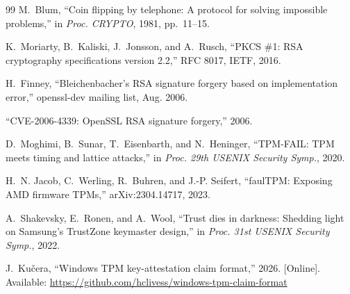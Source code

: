 \documentclass[conference,10pt]{IEEEtran}
\begin{document}
\begin{thebibliography}{99}
M.~Blum, ``Coin flipping by telephone: A protocol for solving impossible problems,'' in
\emph{Proc. CRYPTO}, 1981, pp.~11--15.

K.~Moriarty, B.~Kaliski, J.~Jonsson, and A.~Rusch, ``PKCS \#1: RSA cryptography
specifications version 2.2,'' RFC 8017, IETF, 2016.

H.~Finney, ``Bleichenbacher's RSA signature forgery based on implementation error,''
openssl-dev mailing list, Aug. 2006.

``CVE-2006-4339: OpenSSL RSA signature forgery,'' 2006.

D.~Moghimi, B.~Sunar, T.~Eisenbarth, and N.~Heninger, ``TPM-FAIL: TPM meets timing and lattice
attacks,'' in \emph{Proc. 29th USENIX Security Symp.}, 2020.

H.~N. Jacob, C.~Werling, R.~Buhren, and J.-P. Seifert, ``faulTPM: Exposing AMD firmware TPMs,''
arXiv:2304.14717, 2023.

A.~Shakevsky, E.~Ronen, and A.~Wool, ``Trust dies in darkness: Shedding light on Samsung's
TrustZone keymaster design,'' in \emph{Proc. 31st USENIX Security Symp.}, 2022.

J.~Ku\v{c}era, ``Windows TPM key-attestation claim format,'' 2026. [Online]. Available:
\url{https://github.com/hclivess/windows-tpm-claim-format}

\end{thebibliography}
\end{document}
